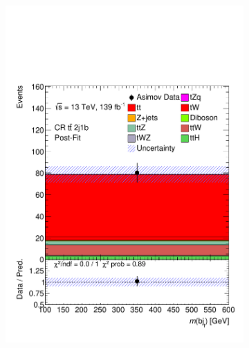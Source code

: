 \begin{figure}[!h]
\begin{subfigure}[b]{0.33\linewidth}
   \includegraphics[width=\textwidth]{ubonn-thesis/Chapters/Chapters_07/Figure/Asmiov/CR_2j1b_postFit.pdf} 
    \caption{}
  \end{subfigure} 
  \centering
  \begin{subfigure}[b]{0.33\linewidth}

\end{subfigure}
\end{figure}
